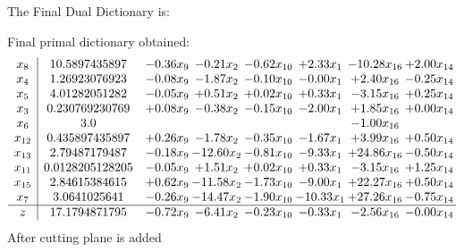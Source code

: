 \documentclass[8pt]{article}
\begin{document}
The Final Dual Dictionary is: 

 Final primal dictionary obtained: 
\[\begin{array}{c| c c@{\hskip 2pt} c@{\hskip 2pt} c@{\hskip 2pt} c@{\hskip 2pt} c@{\hskip 2pt} c@{\hskip 2pt} }
 x_{8}   &  10.5897435897 & -0.36 x_{9} & -0.21 x_{2} & -0.62 x_{10} & +  2.33 x_{1} & -10.28 x_{16} & +  2.00 x_{14}\\
 x_{4}   &  1.26923076923 & -0.08 x_{9} & -1.87 x_{2} & -0.10 x_{10} & -0.00 x_{1} & +  2.40 x_{16} & -0.25 x_{14}\\
 x_{5}   &  4.01282051282 & -0.05 x_{9} & +  0.51 x_{2} & +  0.02 x_{10} & +  0.33 x_{1} & -3.15 x_{16} & +  0.25 x_{14}\\
 x_{3}   &  0.230769230769 & +  0.08 x_{9} & -0.38 x_{2} & -0.15 x_{10} & -2.00 x_{1} & +  1.85 x_{16} & +  0.00 x_{14}\\
 x_{6}   &  3.0  &    &    &    &   & -1.00 x_{16} &   \\
 x_{12}   &  0.435897435897 & +  0.26 x_{9} & -1.78 x_{2} & -0.35 x_{10} & -1.67 x_{1} & +  3.99 x_{16} & +  0.50 x_{14}\\
 x_{13}   &  2.79487179487 & -0.18 x_{9} & -12.60 x_{2} & -0.81 x_{10} & -9.33 x_{1} & + 24.86 x_{16} & -0.50 x_{14}\\
 x_{11}   &  0.0128205128205 & -0.05 x_{9} & +  1.51 x_{2} & +  0.02 x_{10} & +  0.33 x_{1} & -3.15 x_{16} & +  1.25 x_{14}\\
 x_{15}   &  2.84615384615 & +  0.62 x_{9} & -11.58 x_{2} & -1.73 x_{10} & -9.00 x_{1} & + 22.27 x_{16} & +  0.50 x_{14}\\
 x_{7}   &  3.0641025641 & -0.26 x_{9} & -14.47 x_{2} & -1.90 x_{10} & -10.33 x_{1} & + 27.26 x_{16} & -0.75 x_{14}\\
\hline
z    &  17.1794871795 & -0.72 x_{9} & -6.41 x_{2} & -0.23 x_{10} & -0.33 x_{1} & -2.56 x_{16} & -0.00 x_{14}\\
\end{array}\]
 After cutting plane is added 
\end{document}
